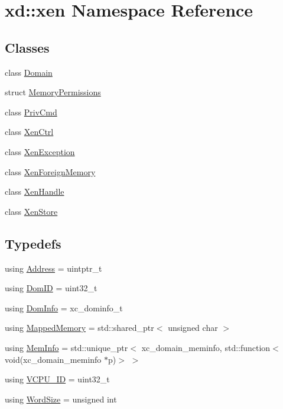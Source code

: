 \hypertarget{namespacexd_1_1xen}{}\section{xd\+:\+:xen Namespace Reference}
\label{namespacexd_1_1xen}
\subsection*{Classes}
\begin{DoxyCompactItemize}
\item 
class \mbox{\hyperlink{classxd_1_1xen_1_1_domain}{Domain}}
\item 
struct \mbox{\hyperlink{structxd_1_1xen_1_1_memory_permissions}{Memory\+Permissions}}
\item 
class \mbox{\hyperlink{classxd_1_1xen_1_1_priv_cmd}{Priv\+Cmd}}
\item 
class \mbox{\hyperlink{classxd_1_1xen_1_1_xen_ctrl}{Xen\+Ctrl}}
\item 
class \mbox{\hyperlink{classxd_1_1xen_1_1_xen_exception}{Xen\+Exception}}
\item 
class \mbox{\hyperlink{classxd_1_1xen_1_1_xen_foreign_memory}{Xen\+Foreign\+Memory}}
\item 
class \mbox{\hyperlink{classxd_1_1xen_1_1_xen_handle}{Xen\+Handle}}
\item 
class \mbox{\hyperlink{classxd_1_1xen_1_1_xen_store}{Xen\+Store}}
\end{DoxyCompactItemize}
\subsection*{Typedefs}
\begin{DoxyCompactItemize}
\item 
using \mbox{\hyperlink{namespacexd_1_1xen_a94a8d6c9448e8330c771c100dba152c3}{Address}} = uintptr\+\_\+t
\item 
using \mbox{\hyperlink{namespacexd_1_1xen_aaad6b5eb6f7e5ba76a4e4ca166ac8a08}{Dom\+ID}} = uint32\+\_\+t
\item 
using \mbox{\hyperlink{namespacexd_1_1xen_a60588fc8910b3e8b14ac3d51e5de41ba}{Dom\+Info}} = xc\+\_\+dominfo\+\_\+t
\item 
using \mbox{\hyperlink{namespacexd_1_1xen_ac9cd783e07e8d847ac0805eec3536746}{Mapped\+Memory}} = std\+::shared\+\_\+ptr$<$ unsigned char $>$
\item 
using \mbox{\hyperlink{namespacexd_1_1xen_a34ff770013f1c25915f83aac337f2334}{Mem\+Info}} = std\+::unique\+\_\+ptr$<$ xc\+\_\+domain\+\_\+meminfo, std\+::function$<$ void(xc\+\_\+domain\+\_\+meminfo $\ast$p)$>$ $>$
\item 
using \mbox{\hyperlink{namespacexd_1_1xen_ac71045dda8a7d9d6fd0d7643001bb14e}{V\+C\+P\+U\+\_\+\+ID}} = uint32\+\_\+t
\item 
using \mbox{\hyperlink{namespacexd_1_1xen_ab0ad6c1b122ad0b67c749ee5bae3cc1c}{Word\+Size}} = unsigned int
\end{DoxyCompactItemize}


